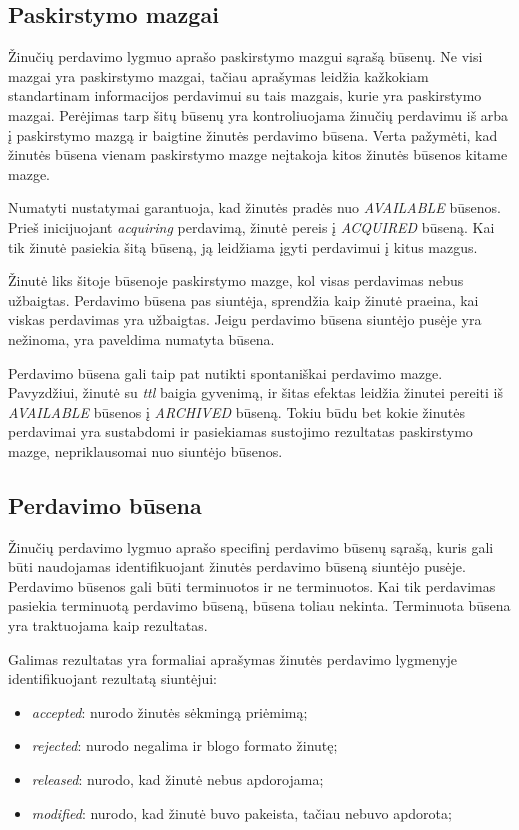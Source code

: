 \documentclass[12pt, a4paper, lithuanian]{article}
\begin{document}
    \subsection{Paskirstymo mazgai}

    Žinučių perdavimo lygmuo aprašo paskirstymo mazgui sąrašą būsenų.
    Ne visi mazgai yra paskirstymo mazgai, tačiau aprašymas leidžia kažkokiam standartinam informacijos perdavimui su tais mazgais, kurie yra paskirstymo mazgai.
    Perėjimas tarp šitų būsenų yra kontroliuojama žinučių perdavimu iš arba į paskirstymo mazgą ir baigtine žinutės perdavimo būsena.
    Verta pažymėti, kad žinutės būsena vienam paskirstymo mazge neįtakoja kitos žinutės būsenos kitame mazge.

    Numatyti nustatymai garantuoja, kad žinutės pradės nuo \textit{AVAILABLE} būsenos.
    Prieš inicijuojant \textit{acquiring} perdavimą, žinutė pereis į \textit{ACQUIRED} būseną.
    Kai tik žinutė pasiekia šitą būseną, ją leidžiama įgyti perdavimui į kitus mazgus.

    Žinutė liks šitoje būsenoje paskirstymo mazge, kol visas perdavimas nebus užbaigtas.
    Perdavimo būsena pas siuntėja, sprendžia kaip žinutė praeina, kai viskas perdavimas yra užbaigtas.
    Jeigu perdavimo būsena siuntėjo pusėje yra nežinoma, yra paveldima numatyta būsena.

    Perdavimo būsena gali taip pat nutikti spontaniškai perdavimo mazge.
    Pavyzdžiui, žinutė su \textit{ttl} baigia gyvenimą, ir šitas efektas leidžia žinutei pereiti iš \textit{AVAILABLE} būsenos į \textit{ARCHIVED} būseną.
    Tokiu būdu bet kokie žinutės perdavimai yra sustabdomi ir pasiekiamas sustojimo rezultatas paskirstymo mazge, nepriklausomai nuo siuntėjo būsenos.

    \subsection{Perdavimo būsena}

    Žinučių perdavimo lygmuo aprašo specifinį perdavimo būsenų sąrašą, kuris gali būti naudojamas identifikuojant žinutės perdavimo būseną siuntėjo pusėje.
    Perdavimo būsenos gali būti terminuotos ir ne terminuotos.
    Kai tik perdavimas pasiekia terminuotą perdavimo būseną, būsena toliau nekinta.
    Terminuota būsena yra traktuojama kaip rezultatas.

    Galimas rezultatas yra formaliai aprašymas žinutės perdavimo lygmenyje identifikuojant rezultatą siuntėjui:

    \begin{itemize}
        \item \textit{accepted}: nurodo žinutės sėkmingą priėmimą;
        \item \textit{rejected}: nurodo negalima ir blogo formato žinutę;
        \item \textit{released}: nurodo, kad žinutė nebus apdorojama;
        \item \textit{modified}: nurodo, kad žinutė buvo pakeista, tačiau nebuvo apdorota;
    \end{itemize}
\end{document}
